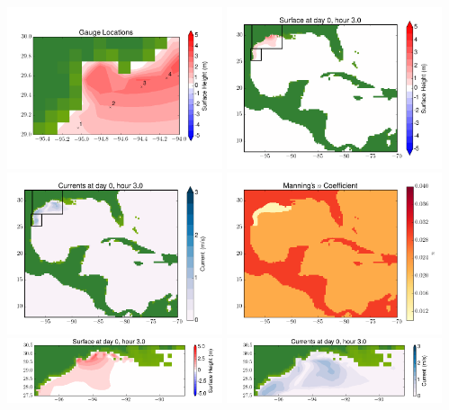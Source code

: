 \documentclass[11pt]{article}
\begin{document}
\includegraphics[width=0.475\textwidth]{frame0074fig10.png}
\vskip 10pt 
\includegraphics[width=0.475\textwidth]{frame0075fig1.png}
\includegraphics[width=0.475\textwidth]{frame0075fig2.png}
\vskip 10pt 
\includegraphics[width=0.475\textwidth]{frame0075fig3.png}
\includegraphics[width=0.475\textwidth]{frame0075fig4.png}
\vskip 10pt 
\includegraphics[width=0.475\textwidth]{frame0075fig5.png}
\end{document}

